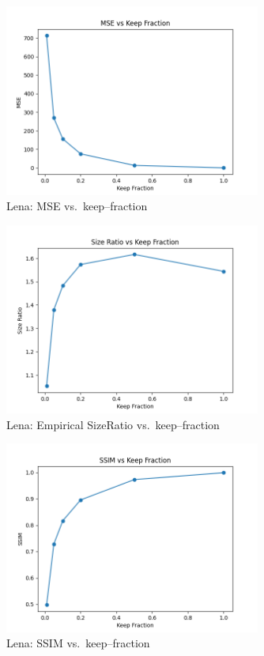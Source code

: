 \documentclass[12pt]{article}
\begin{document}
\begin{figure}[H]
  \centering
  \includegraphics[width=0.75\textwidth]{mse_vs_keep_Lena.png}
  \caption{Lena: MSE vs.\ keep–fraction}
\end{figure}

\begin{figure}[H]
  \centering
  \includegraphics[width=0.75\textwidth]{size_ratio_vs_keep_Lena.png}
  \caption{Lena: Empirical SizeRatio vs.\ keep–fraction}
\end{figure}

\begin{figure}[H]
  \centering
  \includegraphics[width=0.75\textwidth]{ssim_vs_keep_Lena.png}
  \caption{Lena: SSIM vs.\ keep–fraction}
\end{figure}
\end{document}
